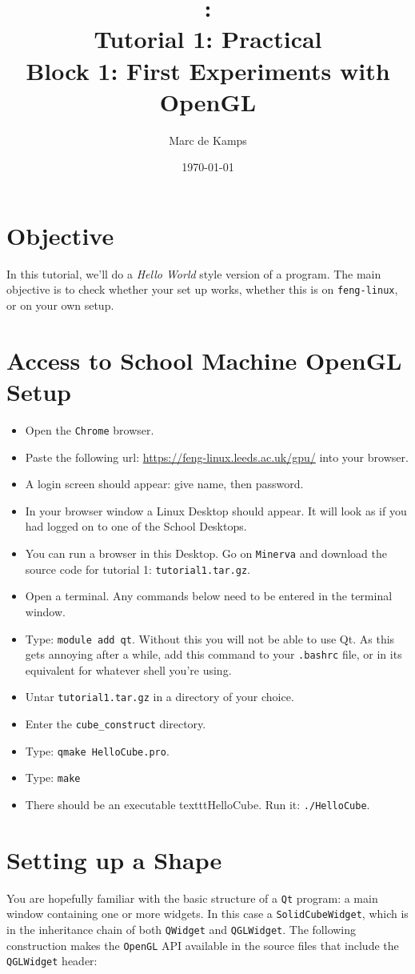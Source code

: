\documentclass[a4wide]{article}
\title{\modulecode: \modulename\\
         Tutorial 1: Practical\\
       Block 1: First Experiments with OpenGL}
\author{Marc de Kamps}
\date{\today}
\begin{document}
\lstset{language=C++,basicstyle=\tiny}

\maketitle
\section*{Objective}
In this tutorial, we'll do a \emph{Hello World} style version of a program. The main objective is to check whether your set up works, whether
this is on \texttt{feng-linux}, or on your own setup.

\section*{Access to School Machine OpenGL Setup}
\begin{itemize}
\item Open the \texttt{Chrome} browser.
\item Paste the following url: \url{https://feng-linux.leeds.ac.uk/gpu/} into your browser.
\item A login screen should appear: give name, then password.
\item In your browser window a Linux Desktop should appear. It will look as if you had logged on to one of the School Desktops.
\item You can run a browser in this Desktop. Go on \texttt{Minerva} and download the source code for tutorial 1: \texttt{tutorial1.tar.gz}.
\item Open a terminal. Any commands below need to be entered in the terminal window.
\item Type: \texttt{module add qt}. Without this you will not be able to use Qt. As this gets annoying after a while, add this command to your \texttt{.bashrc} file, or in its equivalent for whatever shell you're using.

\item Untar \texttt{tutorial1.tar.gz} in a directory of your choice.
\item Enter the \texttt{cube\_construct} directory.  
\item Type: \texttt{qmake HelloCube.pro}.
\item Type: \texttt{make}
\item There should be an executable texttt{HelloCube}. Run it: \texttt{./HelloCube}.
\end{itemize}


\section*{Setting up a Shape}
You are hopefully familiar with the basic structure of a \texttt{Qt} program: a main window containing one or
more widgets. In this case a \texttt{SolidCubeWidget}, which is in the inheritance chain of both \texttt{QWidget} and \texttt{QGLWidget}. The following
construction makes the \texttt{OpenGL} API available in the source files that include the \texttt{QGLWidget} header:
\end{document}
